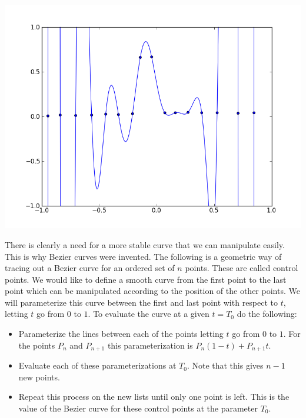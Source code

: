 \includegraphics[width=\textwidth]{bad_interpolation2}

There is clearly a need for a more stable curve that we can manipulate easily. 
This is why Bezier curves were invented. 
The following is a geometric way of tracing out a Bezier curve for an ordered set of $n$ points. 
These are called control points. 
We would like to define a smooth curve from the first point to the last point which can be manipulated according to the position of the other points. 
We will parameterize this curve between the first and last point with respect to $t$, letting $t$ go from $0$ to $1$. 
To evaluate the curve at a given $t=T_0$ do the following:
\begin{itemize}

\item

Parameterize the lines between each of the points letting $t$ go from $0$ to $1$. 
For the points $P_{n}$ and $P_{n+1}$ this parameterization is $P_{n} (1-t) + P_{n+1} t$.

\item

Evaluate each of these parameterizations at $T_0$. 
Note that this gives $n-1$ new points.

\item

Repeat this process on the new lists until only one point is left. 
This is the value of the Bezier curve for these control points at the parameter $T_0$.

\end{itemize}

